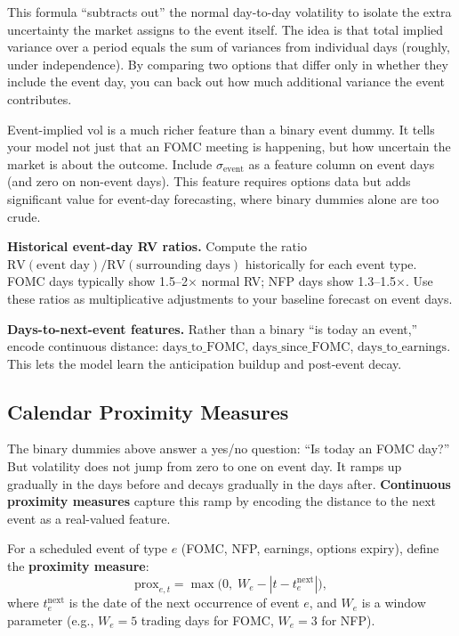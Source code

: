 \begin{intuition}
This formula ``subtracts out'' the normal day-to-day volatility to isolate the extra uncertainty the market assigns to the event itself. The idea is that total implied variance over a period equals the sum of variances from individual days (roughly, under independence). By comparing two options that differ only in whether they include the event day, you can back out how much additional variance the event contributes.
\end{intuition}

\begin{projectconnection}
Event-implied vol is a much richer feature than a binary event dummy. It tells your model not just that an FOMC meeting is happening, but how uncertain the market is about the outcome. Include $\sigma_{\text{event}}$ as a feature column on event days (and zero on non-event days). This feature requires options data but adds significant value for event-day forecasting, where binary dummies alone are too crude.
\end{projectconnection}

\textbf{Historical event-day RV ratios.}
Compute the ratio $\text{RV}(\text{event day}) / \text{RV}(\text{surrounding days})$ historically for each event type.
FOMC days typically show 1.5--2$\times$ normal RV; NFP days show 1.3--1.5$\times$.
Use these ratios as multiplicative adjustments to your baseline forecast on event days.

\textbf{Days-to-next-event features.}
Rather than a binary ``is today an event,'' encode continuous distance: $\text{days\_to\_FOMC}$, $\text{days\_since\_FOMC}$, $\text{days\_to\_earnings}$.
This lets the model learn the anticipation buildup and post-event decay.

\subsection{Calendar Proximity Measures}\label{sec:feat-proximity}

The binary dummies above answer a yes/no question: ``Is today an FOMC day?''
But volatility does not jump from zero to one on event day.
It ramps up gradually in the days before and decays gradually in the days after.
\textbf{Continuous proximity measures} capture this ramp by encoding the distance to the next event as a real-valued feature.

\begin{definition}
For a scheduled event of type $e$ (FOMC, NFP, earnings, options expiry), define the \textbf{proximity measure}:
\begin{equation}\label{eq:proximity}
\text{prox}_{e,t} = \max\!\bigl(0,\; W_e - |t - t_e^{\text{next}}|\bigr),
\end{equation}
where $t_e^{\text{next}}$ is the date of the next occurrence of event $e$, and $W_e$ is a window parameter (e.g., $W_e = 5$ trading days for FOMC, $W_e = 3$ for NFP).
\end{definition}

